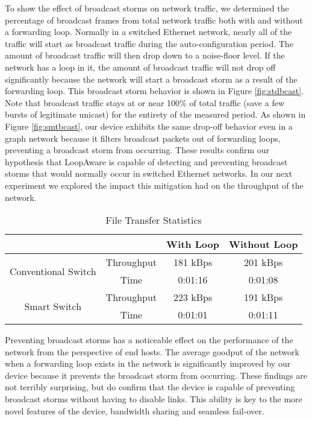 	To show the effect of broadcast storms on network traffic, we determined the percentage of broadcast frames from total network traffic both with and without a forwarding loop.
	Normally in a switched Ethernet network, nearly all of the traffic will start as broadcast traffic during the auto-configuration period.
	The amount of broadcast traffic will then drop down to a noise-floor level.
	If the network has a loop in it, the amount of broadcast traffic will not drop off significantly because the network will start a broadcast storm as a result of the forwarding loop.
	This broadcast storm behavior is shown in Figure \ref{fig:stdbcast}.
	Note that broadcast traffic stays at or near 100\% of total traffic (save a few bursts of legitimate unicast) for the entirety of the measured period. 
	As shown in Figure \ref{fig:smtbcast}, our device exhibits the same drop-off behavior even in a graph network because it filters broadcast packets out of forwarding loops, preventing a broadcast storm from occurring.
	These results confirm our hypothesis that LoopAware is capable of detecting and preventing broadcast storms that would normally occur in switched Ethernet networks.
	In our next experiment we explored the impact this mitigation had on the throughput of the network.

	\begin{table}[ht]
		\centering
		\caption{File Transfer Statistics}
		\label{tab:throughput}
		\begin{tabular}{|c|c|c|c|}
			\hline
			\multicolumn{2}{|c|}{} & With Loop	& Without Loop \\
			\hline
			\multirow{2}{*}{Conventional Switch}& Throughput	& 181 kBps	& 201 kBps \\ \cline{2-4}
			& Time	& 0:01:16	& 0:01:08 \\
			\hline
			\multirow{2}{*}{Smart Switch}	& Throughput	& 223 kBps	& 191 kBps \\ \cline{2-4}
			& Time	& 0:01:01	& 0:01:11\\
			\hline
		\end{tabular}
	\end{table}

	Preventing broadcast storms has a noticeable effect on the performance of the network from the perspective of end hosts.
	The average goodput of the network when a forwarding loop exists in the network is significantly improved by our device because it prevents the broadcast storm from occurring.
	These findings are not terribly surprising, but do confirm that the device is capable of preventing broadcast storms without having to disable links.
	This ability is key to the more novel features of the device, bandwidth sharing and seamless fail-over.

